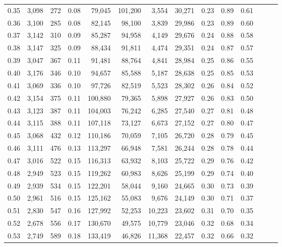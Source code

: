 \begin{tabular}{rrrrrrrrrrrrrr}
0.35 &  3,098 &    272 &  0.08 &   79,045 &  101,200 &   3,554 &  30,271 &  0.23 &  0.89 &      0.61 \\
0.36 &  3,100 &    285 &  0.08 &   82,145 &   98,100 &   3,839 &  29,986 &  0.23 &  0.89 &      0.60 \\
0.37 &  3,142 &    310 &  0.09 &   85,287 &   94,958 &   4,149 &  29,676 &  0.24 &  0.88 &      0.58 \\
0.38 &  3,147 &    325 &  0.09 &   88,434 &   91,811 &   4,474 &  29,351 &  0.24 &  0.87 &      0.57 \\
0.39 &  3,047 &    367 &  0.11 &   91,481 &   88,764 &   4,841 &  28,984 &  0.25 &  0.86 &      0.55 \\
0.40 &  3,176 &    346 &  0.10 &   94,657 &   85,588 &   5,187 &  28,638 &  0.25 &  0.85 &      0.53 \\
0.41 &  3,069 &    336 &  0.10 &   97,726 &   82,519 &   5,523 &  28,302 &  0.26 &  0.84 &      0.52 \\
0.42 &  3,154 &    375 &  0.11 &  100,880 &   79,365 &   5,898 &  27,927 &  0.26 &  0.83 &      0.50 \\
0.43 &  3,123 &    387 &  0.11 &  104,003 &   76,242 &   6,285 &  27,540 &  0.27 &  0.81 &      0.48 \\
0.44 &  3,115 &    388 &  0.11 &  107,118 &   73,127 &   6,673 &  27,152 &  0.27 &  0.80 &      0.47 \\
0.45 &  3,068 &    432 &  0.12 &  110,186 &   70,059 &   7,105 &  26,720 &  0.28 &  0.79 &      0.45 \\
0.46 &  3,111 &    476 &  0.13 &  113,297 &   66,948 &   7,581 &  26,244 &  0.28 &  0.78 &      0.44 \\
0.47 &  3,016 &    522 &  0.15 &  116,313 &   63,932 &   8,103 &  25,722 &  0.29 &  0.76 &      0.42 \\
0.48 &  2,949 &    523 &  0.15 &  119,262 &   60,983 &   8,626 &  25,199 &  0.29 &  0.74 &      0.40 \\
0.49 &  2,939 &    534 &  0.15 &  122,201 &   58,044 &   9,160 &  24,665 &  0.30 &  0.73 &      0.39 \\
0.50 &  2,961 &    516 &  0.15 &  125,162 &   55,083 &   9,676 &  24,149 &  0.30 &  0.71 &      0.37 \\
0.51 &  2,830 &    547 &  0.16 &  127,992 &   52,253 &  10,223 &  23,602 &  0.31 &  0.70 &      0.35 \\
0.52 &  2,678 &    556 &  0.17 &  130,670 &   49,575 &  10,779 &  23,046 &  0.32 &  0.68 &      0.34 \\
0.53 &  2,749 &    589 &  0.18 &  133,419 &   46,826 &  11,368 &  22,457 &  0.32 &  0.66 &      0.32 \\

\end{tabular}
